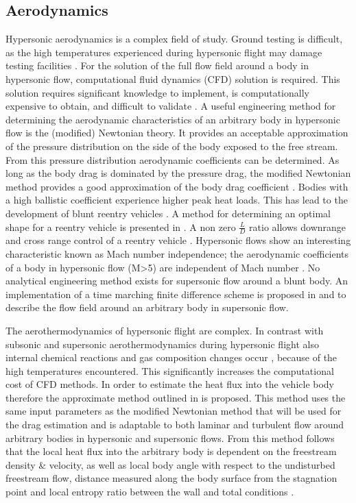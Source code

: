 \subsection{Aerodynamics} \label{sec:aero}
Hypersonic aerodynamics is a complex field of study. Ground testing is difficult, as the high temperatures experienced during hypersonic flight may damage testing facilities \cite{AndersonJr.2006} \cite{Bertin1994}. For the solution of the full flow field around a body in hypersonic flow, computational fluid dynamics (CFD) solution is required. This solution requires significant knowledge to implement, is computationally expensive to obtain, and difficult to validate \cite{AndersonJr.2006} \cite{Bertin1994}. A useful engineering method for determining the aerodynamic characteristics of an arbitrary body in hypersonic flow is the (modified) Newtonian theory. It provides an acceptable approximation of the pressure distribution on the side of the body exposed to the free stream. From this pressure distribution aerodynamic coefficients can be determined. As long as the body drag is dominated by the pressure drag, the modified Newtonian method provides a good approximation of the body drag coefficient \cite{AndersonJr.2006} \cite{Bertin1994} \cite{Bertin2006}. Bodies with a high ballistic coefficient experience higher peak heat loads. This has lead to the development of blunt reentry vehicles\cite{Bertin1994} \cite{Theisinger2009}. A method for determining an optimal shape for a reentry vehicle is presented in \cite{Theisinger2009}. A non zero $\frac{L}{D}$ ratio allows downrange and cross range control of a reentry vehicle \cite{Theisinger2009}. Hypersonic flows show an interesting characteristic known as Mach number independence; the aerodynamic coefficients of a body in hypersonic flow (M>5) are independent of Mach number \cite{Bertin1994,AndersonJr.2007,Hollis}. No analytical engineering method exists for supersonic flow around a blunt body. An implementation of a time marching finite difference scheme is proposed in \cite{AndersonJr.2007} and \cite{AndersonJr.2006} to describe the flow field around an arbitrary body in supersonic flow. 

The aerothermodynamics of hypersonic flight are complex. In contrast with subsonic and supersonic aerothermodynamics during hypersonic flight also internal chemical reactions and gas composition changes occur \cite{AndersonJr.2006}, because of the high temperatures encountered. This significantly increases the computational cost of CFD methods. In order to estimate the heat flux into the vehicle body therefore the approximate method outlined in \cite{Tauber1986} \cite{AndersonJr.2006} is proposed. This method uses the same input parameters as the modified Newtonian method that will be used for the drag estimation and is adaptable to both laminar and turbulent flow around arbitrary bodies in hypersonic and supersonic flows. From this method follows that the local heat flux into the arbitrary body is dependent on the freestream density \& velocity, as well as local body angle with respect to the undisturbed freestream flow, distance measured along the body surface from the stagnation point and local entropy ratio between the wall and total conditions \cite{Tauber1986} \cite{AndersonJr.2006}.